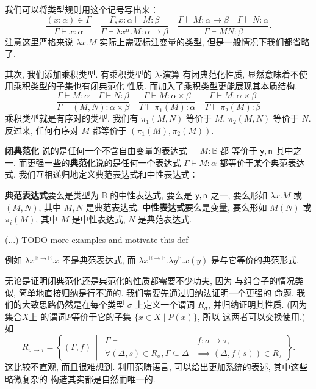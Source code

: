 我们可以将类型规则用这个记号写出来：
\[\frac{(x{:}\alpha) \in \Gamma}{\Gamma \vdash x : \alpha}
\quad\frac{\Gamma, x{:}\alpha \vdash M : \beta}{\Gamma \vdash \lambda x^\alpha. M : \alpha \to \beta}
\quad\frac{\Gamma \vdash M : \alpha \to \beta
\quad \Gamma \vdash N : \alpha}{\Gamma \vdash MN : \beta}.\]
注意这里严格来说 \(\lambda x. M\) 实际上需要标注变量的类型,
但是一般情况下我们都省略了.

其次, 我们添加乘积类型. 有乘积类型的 \(\lambda\)-演算
有闭典范化性质, 显然意味着不使用乘积类型的子集也有闭典范化
性质. 而加入了乘积类型更能展现其本质结构.
\[
\frac{\Gamma \vdash M : \alpha \quad \Gamma \vdash N : \beta}{\Gamma \vdash (M, N) : \alpha \times \beta}
\quad\frac{\Gamma \vdash M : \alpha\times\beta}{\Gamma\vdash\pi_1(M) : \alpha}
\quad\frac{\Gamma \vdash M : \alpha\times\beta}{\Gamma\vdash\pi_2(M) : \beta}
\]
乘积类型就是有序对的类型. 我们有 \(\pi_1(M, N)\) 等价于
\(M\), \(\pi_2(M, N)\) 等价于 \(N\). 反过来, 任何有序对
\(M\) 都等价于 \((\pi_1(M), \pi_2(M))\).

\textbf{闭典范化}
说的是任何一个不含自由变量的表达式
\(\vdash M : \mathbb B\) 都
等价于 \(\textsf{y}, \textsf{n}\) 其中之一.
而更强一些的\textbf{典范化}说的是任何一个表达式
\(\Gamma \vdash M : \alpha\) 都等价于某个典范表达式.
我们互相递归地定义典范表达式和中性表达式：
\begin{definition}
\textbf{典范表达式}要么是类型为 \(\mathbb B\) 的中性表达式,
要么是 \(\textsf{y},\textsf{n}\) 之一,
要么形如 \(\lambda x. M\) 或 \((M, N)\),
其中 \(M, N\) 是典范表达式.
\textbf{中性表达式}要么是变量, 要么形如 \(M(N)\) 或
\(\pi_i(M)\), 其中 \(M\) 是中性表达式, \(N\) 是典范表达式.
\end{definition}

(...) TODO more examples and motivate this def

例如 \(\lambda x^{\mathbb B \to \mathbb B}. x\)
不是典范表达式, 而 \(\lambda x^{\mathbb B \to \mathbb B}.
\lambda y^{\mathbb B}. x(y)\) 是与它等价的典范形式.

无论是证明闭典范化还是典范化的性质都需要不少功夫, 因为
与组合子的情况类似, 简单地直接归纳是行不通的.
我们需要先通过归纳法证明一个更强的
命题. 我们的大致思路仍然是在每个类型 \(\sigma\) 上定义一个谓词
\(R_\sigma\), 并归纳证明其性质. (因为集合\(X\)上
的谓词\(P\)等价于它的子集 \(\{x\in X\mid P(x)\}\), 所以
这两者可以交换使用.) 如
\[R_{\sigma \to \tau} = \left\{(\Gamma, f) \,\middle|\,
\begin{aligned}
\Gamma \vdash&\, f:\sigma\to\tau, \\ \forall (\Delta, s) \in R_\sigma, \Gamma \subseteq \Delta &\implies (\Delta, f(s)) \in R_\tau
\end{aligned}
\right\}.\]
这比较不直观, 而且很难想到.
利用范畴语言, 可以给出更加系统的表述, 其中这些略微复杂的
构造其实都是自然而唯一的.


